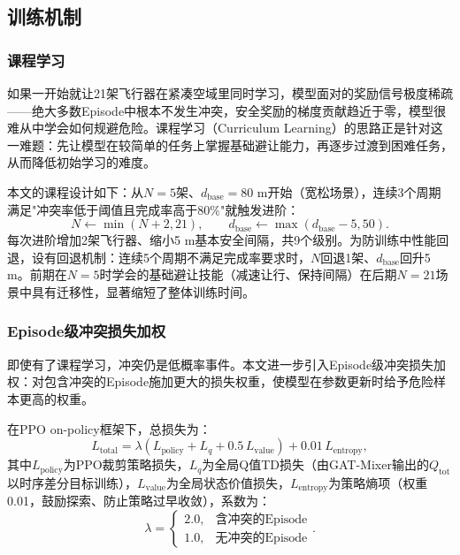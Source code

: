\documentclass[12pt,a4paper,UTF8]{ctexart}
\begin{document}
\subsection{训练机制}

\subsubsection{课程学习}

如果一开始就让21架飞行器在紧凑空域里同时学习，模型面对的奖励信号极度稀疏——绝大多数Episode中根本不发生冲突，安全奖励的梯度贡献趋近于零，模型很难从中学会如何规避危险。课程学习（Curriculum Learning）\cite{ref39}的思路正是针对这一难题：先让模型在较简单的任务上掌握基础避让能力，再逐步过渡到困难任务，从而降低初始学习的难度。

本文的课程设计如下：从$N=5$架、$d_{\text{base}}=80$ m开始（宽松场景），连续3个周期满足"冲突率低于阈值且完成率高于80\%"就触发进阶：
\begin{equation}
    N \leftarrow \min(N+2, 21), \qquad d_{\text{base}} \leftarrow \max(d_{\text{base}}-5, 50).
    \label{eq:curriculum}
\end{equation}
每次进阶增加2架飞行器、缩小5 m基本安全间隔，共9个级别。为防训练中性能回退，设有回退机制：连续5个周期不满足完成率要求时，$N$回退1架、$d_{\text{base}}$回升5 m。前期在$N=5$时学会的基础避让技能（减速让行、保持间隔）在后期$N=21$场景中具有迁移性，显著缩短了整体训练时间。

\subsubsection{Episode级冲突损失加权}

即使有了课程学习，冲突仍是低概率事件。本文进一步引入Episode级冲突损失加权：对包含冲突的Episode施加更大的损失权重，使模型在参数更新时给予危险样本更高的权重。

在PPO\cite{ref30} on-policy框架下，总损失为：
\begin{equation}
    L_{\text{total}} = \lambda\left(L_{\text{policy}} + L_{q} + 0.5\,L_{\text{value}}\right) + 0.01\,L_{\text{entropy}},
    \label{eq:total_loss}
\end{equation}
其中$L_{\text{policy}}$为PPO裁剪策略损失，$L_{q}$为全局Q值TD损失（由GAT-Mixer输出的$Q_{\text{tot}}$以时序差分目标训练），$L_{\text{value}}$为全局状态价值损失，$L_{\text{entropy}}$为策略熵项（权重0.01，鼓励探索、防止策略过早收敛），系数为：
\begin{equation}
    \lambda = \begin{cases}
        2.0, & \text{含冲突的Episode}\\
        1.0, & \text{无冲突的Episode}
    \end{cases}.
    \label{eq:lambda}
\end{equation}
\end{document}
